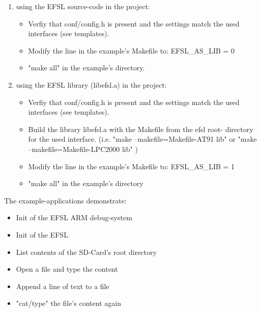 \begin{enumerate}

\item using the EFSL source-code in the project:

	\begin{itemize}

\item Verfiy that conf/config.h is present
and the settings match the used 
interfaces (see templates).

\item Modify the line in the example's 
Makefile to: EFSL_AS_LIB = 0

\item "make all" in the example's directory.

	\end{itemize}


\item using the EFSL library (libefsl.a) in the project:

	\begin{itemize}

\item Verfiy that conf/config.h is present
and the settings match the used 
interfaces (see templates).

\item Build the library libefsl.a with
the Makefile from the efsl root-
directory for the used interface.
(i.e. "make --makefile=Makefile-AT91 lib" 
or "make --makefile=Makefile-LPC2000 lib" )

\item Modify the line in the example's 
Makefile to: EFSL\_AS\_LIB = 1

\item "make all" in the example's directory
	\end{itemize}

\end{enumerate}


The example-applications demonstrate:
	\begin{itemize}
\item Init of the EFSL ARM debug-system
\item Init of the EFSL
\item List contents of the SD-Card's
root directory
\item Open a file and type the content
\item Append a line of text to a file
\item "cat/type" the file's content again
	\end{itemize}

